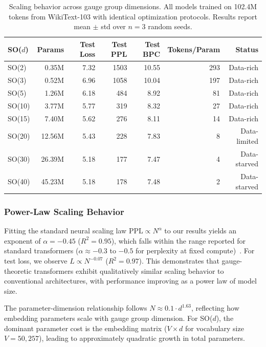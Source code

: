\documentclass[twoside,11pt]{article}
\begin{document}
\begin{table}[h]
\centering
\small
\caption{Scaling behavior across gauge group dimensions. All models trained on 102.4M tokens from WikiText-103 with identical optimization protocols. Results report mean $\pm$ std over $n=3$ random seeds.}
\label{tab:scaling_results}
\begin{tabular}{lrrrrrr}
\toprule
\textbf{SO($d$)} & \textbf{Params} & \textbf{Test Loss} & \textbf{Test PPL} & \textbf{Test BPC} & \textbf{Tokens/Param} & \textbf{Status} \\
\midrule
SO(2) & 0.35M & 7.32 & 1503 & 10.55 & 293 & Data-rich \\
SO(3) & 0.52M & 6.96 & 1058 & 10.04 & 197 & Data-rich \\
SO(5) & 1.26M & 6.18 & 484 & 8.92 & 81 & Data-rich \\
SO(10) & 3.77M & 5.77 & 319 & 8.32 & 27 & Data-rich \\
SO(15) & 7.40M & 5.62 & 276 & 8.11 & 14 & Data-rich \\
SO(20) & 12.56M & 5.43 & 228 & 7.83 & 8 & Data-limited \\
SO(30) & 26.39M & 5.18 & 177 & 7.47 & 4 & Data-starved \\
SO(40) & 45.23M & 5.18 & 178 & 7.48 & 2 & Data-starved \\
\bottomrule
\end{tabular}
\end{table}

\subsubsection{Power-Law Scaling Behavior}

Fitting the standard neural scaling law $\text{PPL} \propto N^{\alpha}$ to our results yields an exponent of $\alpha = -0.45$ ($R^2 = 0.95$), which falls within the range reported for standard transformers ($\alpha \approx -0.3$ to $-0.5$ for perplexity at fixed compute)~\citep{hoffmann2022training}. For test loss, we observe $L \propto N^{-0.07}$ ($R^2 = 0.97$). This demonstrates that gauge-theoretic transformers exhibit qualitatively similar scaling behavior to conventional architectures, with performance improving as a power law of model size.

The parameter-dimension relationship follows $N \approx 0.1 \cdot d^{1.63}$, reflecting how embedding parameters scale with gauge group dimension. For SO($d$), the dominant parameter cost is the embedding matrix ($V \times d$ for vocabulary size $V = 50{,}257$), leading to approximately quadratic growth in total parameters.
\end{document}

